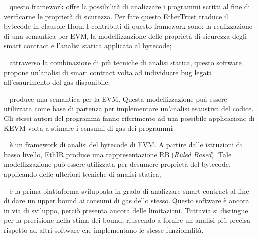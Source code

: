 \begin{description}[labelindent=1cm]    %

\item[EtherTrust] ~\cite{grishchenko2018foundations} questo framework offre la possibilità di analizzare i programmi scritti al fine di verificarne le proprietà di sicurezza. Per fare questo EtherTrust traduce il bytecode in clausole Horn. I contributi di questo framework sono: la realizzazione di una semantica per EVM, la modellizzazione delle proprietà di sicurezza degli smart contract e l'analisi statica applicata al bytecode;

\item[MadMax] ~\cite{grech2018madmax} attraverso la combinazione di più tecniche di analisi statica, questo software propone un'analisi di smart contract volta ad individuare bug legati all'esaurimento del gas disponibile;

\item[KEVM] ~\cite{hildenbrandt2017kevm} produce una semantica per la EVM. Questa modellizzazione puà essere utilizzata come base di partenza per implementare un'analisi esaustiva del codice. Gli stessi autori del programma fanno riferimento ad una possibile applicazione di KEVM volta a stimare i consumi di gas dei programmi;

\item[EthIR] ~\cite{albert2018ethir} è un framework di analisi del bytecode di EVM. A partire dalle istruzioni di basso livello, EthIR produce una rappresentazione RB (\textit{Ruled Based}). Tale modellizzazione può essere utilizzata per desumere proprietà del bytecode, applicando delle ulteriori tecniche di analisi statica;

\item[GASTAP] ~\cite{DBLP:journals/corr/abs-1811-10403} è la prima piattaforma sviluppata in grado di analizzare smart contract al fine di dare un upper bound ai consumi di gas dello stesso. Questo software è ancora in via di sviluppo, perciò presenta ancora delle limitazioni. Tuttavia si distingue per la precisione nella stima dei bound, riuscendo a fornire un analisi più precisa rispetto ad altri software che implementano le stesse funzionalità. 

\end{description}


